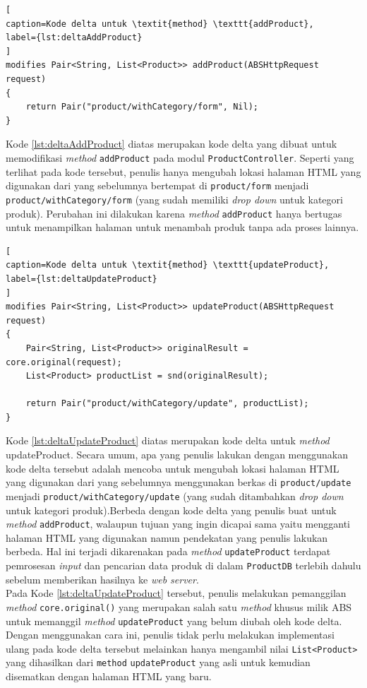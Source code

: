 \begin{lstlisting}[
caption=Kode delta untuk \textit{method} \texttt{addProduct},
label={lst:deltaAddProduct}
]
modifies Pair<String, List<Product>> addProduct(ABSHttpRequest request)
{	
	return Pair("product/withCategory/form", Nil);
}
\end{lstlisting}

Kode \ref{lst:deltaAddProduct} diatas merupakan kode delta yang dibuat untuk memodifikasi \textit{method} \texttt{addProduct} pada modul \texttt{ProductController}. Seperti yang terlihat pada kode tersebut, penulis hanya mengubah lokasi halaman HTML yang digunakan dari yang sebelumnya bertempat di \texttt{product/form} menjadi \texttt{product/withCategory/form} (yang sudah memiliki \textit{drop down} untuk kategori produk). Perubahan ini dilakukan karena \textit{method} \texttt{addProduct} hanya bertugas untuk menampilkan halaman untuk menambah produk tanpa ada proses lainnya.

\begin{lstlisting}[
caption=Kode delta untuk \textit{method} \texttt{updateProduct},
label={lst:deltaUpdateProduct}
]
modifies Pair<String, List<Product>> updateProduct(ABSHttpRequest request)
{
	Pair<String, List<Product>> originalResult = core.original(request);
	List<Product> productList = snd(originalResult);
	
	return Pair("product/withCategory/update", productList);
}
\end{lstlisting}

Kode \ref{lst:deltaUpdateProduct} diatas merupakan kode delta untuk \textit{method} updateProduct. Secara umum, apa yang penulis lakukan dengan menggunakan kode delta tersebut adalah mencoba untuk mengubah lokasi halaman HTML yang digunakan dari yang sebelumnya menggunakan berkas di \texttt{product/update} menjadi \texttt{product/withCategory/update} (yang sudah ditambahkan \textit{drop down} untuk kategori produk).Berbeda dengan kode delta yang penulis buat untuk \textit{method} \texttt{addProduct}, walaupun tujuan yang ingin dicapai sama yaitu mengganti halaman HTML yang digunakan namun pendekatan yang penulis lakukan berbeda. Hal ini terjadi dikarenakan pada \textit{method} \texttt{updateProduct} terdapat pemrosesan \textit{input} dan pencarian data produk di dalam \texttt{ProductDB} terlebih dahulu sebelum memberikan hasilnya ke \textit{web server}.\\

Pada Kode \ref{lst:deltaUpdateProduct} tersebut, penulis melakukan pemanggilan \textit{method} \texttt{core.original()} yang merupakan salah satu \textit{method} khusus milik ABS untuk memanggil \textit{method} \texttt{updateProduct} yang belum diubah oleh kode delta. Dengan menggunakan cara ini, penulis tidak perlu melakukan implementasi ulang pada kode delta tersebut melainkan hanya mengambil nilai \texttt{List<Product>} yang dihasilkan dari \texttt{method} \texttt{updateProduct} yang asli untuk kemudian disematkan dengan halaman HTML yang baru.

